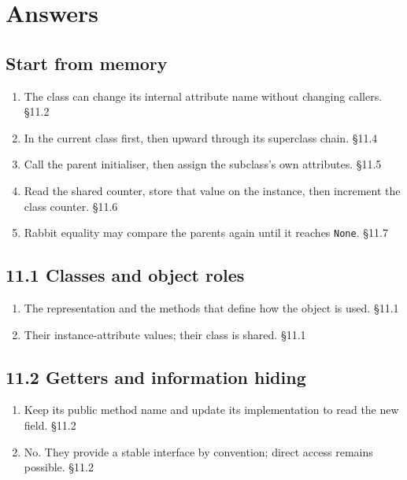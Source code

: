 \documentclass[11pt]{article}
\begin{document}
\section{Answers}
\begin{keepsection}\subsection{Start from memory}

\begin{enumerate}
\item The class can change its internal attribute name without changing callers. \hfill{\small\color{FAUblue}§11.2}
\item In the current class first, then upward through its superclass chain. \hfill{\small\color{FAUblue}§11.4}
\item Call the parent initialiser, then assign the subclass’s own attributes. \hfill{\small\color{FAUblue}§11.5}
\item Read the shared counter, store that value on the instance, then increment the class counter. \hfill{\small\color{FAUblue}§11.6}
\item Rabbit equality may compare the parents again until it reaches \texttt{None}. \hfill{\small\color{FAUblue}§11.7}
\end{enumerate}

\end{keepsection}
\begin{keepsection}\subsection{11.1 Classes and object roles}

\begin{enumerate}
\item The representation and the methods that define how the object is used. \hfill{\small\color{FAUblue}§11.1}
\item Their instance-attribute values; their class is shared. \hfill{\small\color{FAUblue}§11.1}
\end{enumerate}

\end{keepsection}
\begin{keepsection}\subsection{11.2 Getters and information hiding}

\begin{enumerate}
\item Keep its public method name and update its implementation to read the new field. \hfill{\small\color{FAUblue}§11.2}
\item No. They provide a stable interface by convention; direct access remains possible. \hfill{\small\color{FAUblue}§11.2}
\end{enumerate}

\end{keepsection}
\end{document}
